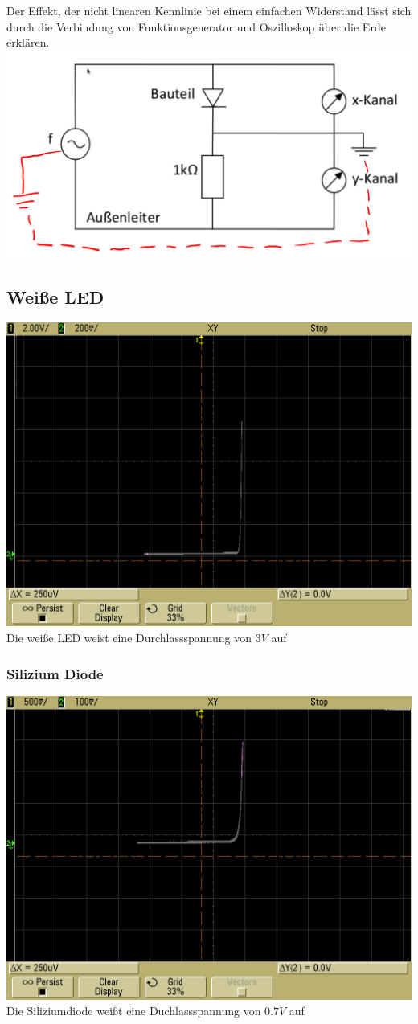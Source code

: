 \documentclass[compress,11pt]{beamer}
\begin{document}
\begin{frame}
Der Effekt, der nicht linearen Kennlinie bei einem einfachen Widerstand lässt sich durch die Verbindung von Funktionsgenerator und Oszilloskop über die Erde erklären.
\includegraphics[width=\textwidth]{images/3-erde.png}
\end{frame}
\subsection{Weiße LED}
\begin{frame}
	\includegraphics[width=.6\textwidth]{images/scope_8}\\
	Die weiße LED weist eine Durchlassspannung von $3V$ auf
\end{frame}
\subsubsection{Silizium Diode}
\begin{frame}
	\includegraphics[width=.6\textwidth]{images/scope_11}\\
	Die Siliziumdiode weißt eine Duchlassspannung von $0.7V$ auf
\end{frame}
\end{document}
